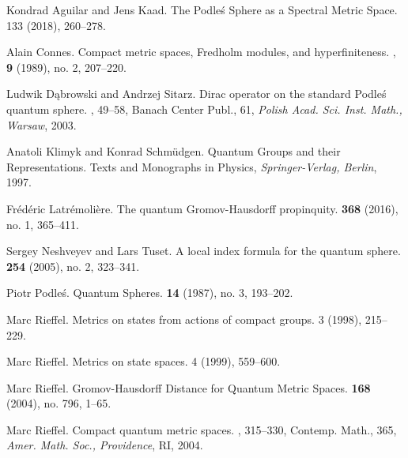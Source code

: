 \documentclass[11pt, reqno, a4paper, final]{amsart}
\theoremstyle{plain}
\theoremstyle{definition}
\begin{document}
\begin{thebibliography}{CdlH16}

Kondrad Aguilar and Jens Kaad.
\newblock The Podle\'s Sphere as a Spectral Metric Space.
 133 (2018), 260--278.

Alain Connes.
\newblock Compact metric spaces, Fredholm modules, and hyperfiniteness.
, {\bf 9} (1989), no. 2, 207--220.

Ludwik Dąbrowski and Andrzej Sitarz.
\newblock  Dirac operator on the standard Podleś quantum sphere. 
, 49--58, Banach Center Publ., 61, {\em Polish Acad. Sci. Inst. Math., Warsaw}, 2003.

Anatoli Klimyk and Konrad Schmüdgen.
\newblock Quantum Groups and their Representations.
\newblock Texts and Monographs in Physics, {\em Springer-Verlag, Berlin}, 1997.

Frédéric Latrémolière.
\newblock The quantum Gromov-Hausdorff propinquity.
 {\bf 368} (2016), no. 1, 365--411. 

 Sergey Neshveyev and Lars Tuset.
\newblock  A local index formula for the quantum sphere. 
 {\bf 254} (2005), no. 2, 323--341. 

Piotr Podle\'s.
\newblock Quantum Spheres.
 {\bf 14} (1987), no. 3, 193--202. 


Marc Rieffel.
\newblock Metrics on states from actions of compact groups.
 3 (1998), 215--229. 

Marc Rieffel.
\newblock Metrics on state spaces.
 4 (1999), 559--600.

Marc Rieffel.
\newblock Gromov-Hausdorff Distance for Quantum Metric Spaces.
 {\bf 168} (2004), no. 796, 1--65. 

Marc Rieffel.
\newblock Compact quantum metric spaces. 
, 315--330, Contemp. Math., 365, {\em Amer. Math. Soc., Providence}, RI, 2004. 


\end{thebibliography}
\end{document}

